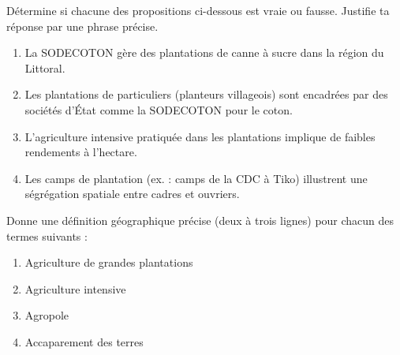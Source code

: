 \documentclass[11pt]{article}
\begin{document}
\begin{exercice}
Détermine si chacune des propositions ci-dessous est vraie ou fausse. Justifie ta réponse par une phrase précise.
\begin{enumerate}
\item La SODECOTON gère des plantations de canne à sucre dans la région du Littoral.
\item Les plantations de particuliers (planteurs villageois) sont encadrées par des sociétés d'État comme la SODECOTON pour le coton.
\item L'agriculture intensive pratiquée dans les plantations implique de faibles rendements à l'hectare.
\item Les camps de plantation (ex. : camps de la CDC à Tiko) illustrent une ségrégation spatiale entre cadres et ouvriers.
\end{enumerate}
\end{exercice}

\begin{exercice}
Donne une définition géographique précise (deux à trois lignes) pour chacun des termes suivants :
\begin{enumerate}
\item Agriculture de grandes plantations
\item Agriculture intensive
\item Agropole
\item Accaparement des terres
\end{enumerate}
\end{exercice}
\end{document}
